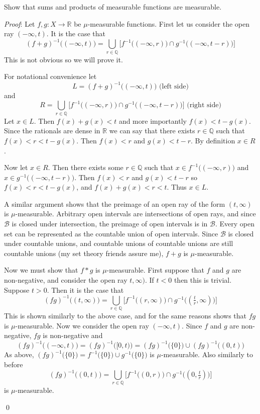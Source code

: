 \documentclass[12pt]{article}
\renewenvironment{proof}{\hspace{-4 ex} \emph{Proof}:}{\qed}
\newcommand{\RR}{\mathbb{R}}
\newcommand{\QQ}{\mathbb{Q}}
\newcommand{\BB}{\mathcal{B}}
\begin{document}
\bigbreak

Show that sums and products of measurable functions are measurable. \bigbreak

\begin{proof}
	Let $f,g: X \to \RR$ be $\mu$-measurable functions. First let us consider the open ray $(-\infty,t)$. It is the case that 
	$$
	(f+g)^{-1}\big ( (-\infty,t) \big) = \bigcup_{r \in \QQ} \Big[ f^{-1}\big( (-\infty,r) \big) \cap g^{-1}\big( (-\infty,t-r) \big) \Big]
	$$
	This is not obvious so we will prove it. \bigbreak
	
	For notational convenience let
	$$
	L = (f+g)^{-1}\big ( (-\infty,t) \big) \text{\ \ \ \ (left side)}
	$$
	and 
	$$
	R = \bigcup_{r \in \QQ} \Big[ f^{-1}\big( (-\infty,r) \big) \cap g^{-1}\big( (-\infty,t-r) \big) \Big] \text{\ \ \ \ \ (right side)}
	$$
	Let $x \in L$. Then $f(x)+g(x) < t$ and more importantly $f(x) < t - g(x)$. Since the rationals are dense in $\RR$ we can say that there exists $r \in \QQ$ such that $f(x) < r < t-g(x)$. Then $f(x) < r$ and $g(x) < t-r$. By definition $x \in R$. \bigbreak
	
	Now let $x \in R$. Then there exists some $r \in \QQ$ such that $x \in f^{-1}\big( (-\infty,r) \big)$ and $x \in g^{-1}\big( (-\infty,t-r) \big)$. Then $f(x)<r$ and $g(x)< t-r$ so $f(x) < r < t-g(x)$, and $f(x)+g(x) < r < t$. Thus $x \in L$. \bigbreak
	
	A similar argument shows that the preimage of an open ray of the form $(t, \infty)$ is $\mu$-measurable. Arbitrary open intervals are intersections of open rays, and since $\BB$ is closed under intersection, the preimage of open intervals is in $\BB$. Every open set can be represented as the countable union of open intervals. Since $\BB$ is closed under countable unions, and countable unions of countable unions are still countable unions (my set theory friends assure me), $f+g$ is $\mu$-measurable. \bigbreak
	
	Now we must show that $f*g$ is $\mu$-measurable. First suppose that $f$ and $g$ are non-negative, and consider the open ray $t,\infty)$. If $t<0$ then this is trivial. Suppose $t>0$. Then it is the case that
	$$
	(fg)^{-1}\big( (t,\infty) \big) = \bigcup_{r \in \QQ} \Big[ f^{-1}\big( (r, \infty) \big) \cap g^{-1}\big( (\tfrac{t}{r}, \infty) \big) \Big]
	$$
	This is shown similarly to the above case, and for the same reasons shows that $fg$ is $\mu$-measurable. Now we consider the open ray $(-\infty, t)$. Since $f$ and $g$ are non-negative, $fg$ is non-negative and 
	$$
	(fg)^{-1}\big( (-\infty, t) \big ) = (fg)^{-1}\big( [0, t) \big ) = (fg)^{-1}\big( \{0\} \big ) \cup (fg)^{-1}\big( (0, t) \big )
	$$
	As above, $(fg)^{-1}\big( \{0\} \big ) = f^{-1}\big( \{0\} \big ) \cup g^{-1}\big( \{0\} \big )$ is $\mu$-measurable. Also similarly to before
	$$
	(fg)^{-1}\big( (0, t) \big ) = \bigcup_{r \in \QQ} \Big[ f^{-1}\big( (0, r) \big) \cap g^{-1}\big( (0,\tfrac{t}{r}) \big) \Big]
	$$
	is $\mu$-measurable. \bigbreak
	

\end{proof}
\end{document}
